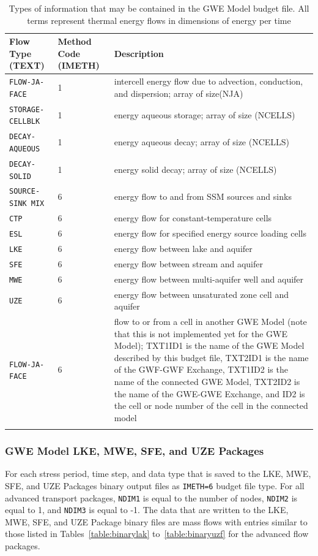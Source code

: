 \begin{longtable}{p{3.5cm} p{2cm} p{9cm}}
\caption{Types of information that may be contained in the GWE Model budget file.  All terms represent thermal energy flows in dimensions of energy per time} 
\tabularnewline
\hline
\textbf{Flow Type (TEXT)} & \textbf{Method Code (IMETH)} & \textbf{Description} \\
\hline
\endhead
\hline
\endfoot
\texttt{FLOW-JA-FACE} & 1 & intercell energy flow due to advection, conduction, and dispersion; array of size(NJA) \\
\texttt{STORAGE-CELLBLK} & 1 & energy aqueous storage; array of size (NCELLS) \\
\texttt{DECAY-AQUEOUS} & 1 & energy aqueous decay; array of size (NCELLS) \\
\texttt{DECAY-SOLID} & 1 & energy solid decay; array of size (NCELLS) \\
\texttt{SOURCE-SINK MIX} & 6 & energy flow to and from SSM sources and sinks \\
\texttt{CTP} & 6 & energy flow for constant-temperature cells \\
\texttt{ESL} & 6 & energy flow for specified energy source loading cells \\
\texttt{LKE} & 6 & energy flow between lake and aquifer \\
\texttt{SFE} & 6 & energy flow between stream and aquifer \\
\texttt{MWE} & 6 & energy flow between multi-aquifer well and aquifer \\
\texttt{UZE} & 6 & energy flow between unsaturated zone cell and aquifer \\
\texttt{FLOW-JA-FACE} & 6 & flow to or from a cell in another GWE Model (note that this is not implemented yet for the GWE Model); TXT1ID1 is the name of the GWE Model described by this budget file, TXT2ID1 is the name of the GWF-GWF Exchange, TXT1ID2 is the name of the connected GWE Model, TXT2ID2 is the name of the GWE-GWE Exchange, and ID2 is the cell or node number of the cell in the connected model \\
\label{table:gwebud}
\end{longtable}

\subsubsection{GWE Model LKE, MWE, SFE, and UZE Packages}

\vspace{5mm}
For each stress period, time step, and data type that is saved to the LKE, MWE, SFE, and UZE Packages binary output files as \texttt{IMETH=6} budget file type. For all advanced transport packages, \texttt{NDIM1} is equal to the number of nodes, \texttt{NDIM2} is equal to 1, and \texttt{NDIM3} is equal to -1. The data that are written to the LKE, MWE, SFE, and UZE Package binary files are mass flows with entries similar to those listed in Tables~\ref{table:binarylak} to~\ref{table:binaryuzf} for the advanced flow packages.


